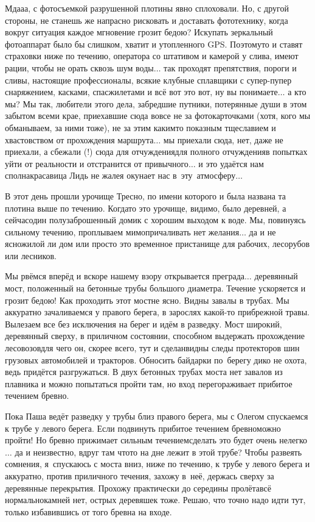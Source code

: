 Мда\sdash а\sdash а, с фотосъемкой разрушенной плотины явно сплоховали. Но, с другой стороны, не станешь же напрасно рисковать и доставать фототехнику, когда вокруг ситуация каждое мгновение грозит бедою? Искупать зеркальный фотоаппарат было бы слишком, хватит и утопленного GPS. Поэтому\sdash то и ставят страховки ниже по течению, оператора со штативом и камерой у слива, имеют рации, чтобы не орать сквозь шум воды$\ldots$ так проходят препятствия, пороги и сливы, настоящие профессионалы, всякие клубные сплавщики с супер-пупер снаряжением, касками, спасжилетами и всё вот это вот, ну вы понимаете$\ldots$ а кто мы? Мы так, любители этого дела, забредшие путники, потерянные души в этом забытом всеми крае, приехавшие сюда вовсе не за фотокарточками (хотя, кого мы обманываем, за ними тоже), не за этим каким\sdash то показным тщеславием и хвастовством от прохождения маршрута$\ldots$ мы приехали сюда, нет, даже не приехали, а сбежали (!) сюда для отчуждения\mdash для полного отчуждения\mdash в попытках уйти от реальности и отстранится от привычного$\ldots$ и это удаётся нам сполна\mdash красавица Лидь не жалея окунает нас в~эту~атмосферу$\ldots$

В этот день прошли урочище Тресно, по имени которого и была названа та плотина выше по течению. Когда\sdash то это урочище, видимо, было деревней, а сейчас\mdash один полузаброшенный домик с хорошим выходом к воде. Мы, повинуясь сильному течению, проплываем мимо\mdash причаливать нет желания$\ldots$ да и не ясно\mdash жилой ли дом или просто это временное пристанище для рабочих, лесорубов или лесников.

Мы рвёмся вперёд и вскоре нашему взору открывается преграда$\ldots$ деревянный мост, положенный на бетонные трубы большого диаметра. Течение ускоряется и грозит бедою! Как проходить этот мост\mdash не ясно. Видны завалы в трубах. Мы аккуратно зачаливаемся у правого берега, в зарослях какой-то прибрежной травы. Вылезаем все без исключения на берег и идём в разведку. Мост широкий, деревянный сверху, в приличном состоянии, способном выдержать прохождение лесовозов\mdash для чего он, скорее всего, тут и сделан\mdash видны следы протекторов шин грузовых автомобилей и тракторов. Обносить байдарки по~берегу дико не охота, ведь придётся разгружаться. В двух бетонных трубах моста нет завалов из плавника и можно попытаться пройти там, но вход перегораживает прибитое течением бревно. 

Пока Паша ведёт разведку у трубы близ правого берега, мы с Олегом спускаемся к трубе у левого берега. Если подвинуть прибитое течением бревно\mdash можно пройти! Но бревно прижимает сильным течением\mdash сделать это будет очень нелегко$\ldots$ да и неизвестно, вдруг там что\sdash то на дне лежит в этой трубе? Чтобы развеять сомнения, я~спускаюсь с моста вниз, ниже по течению, к трубе у левого берега и аккуратно, против приличного течения, захожу в~неё, держась сверху за деревянные перекрытия. Прохожу практически до середины пролёта\mdash всё нормально\mdash камней нет, острых деревяшек тоже. Решаю, что точно надо идти тут, только избавившись от того бревна на входе.

